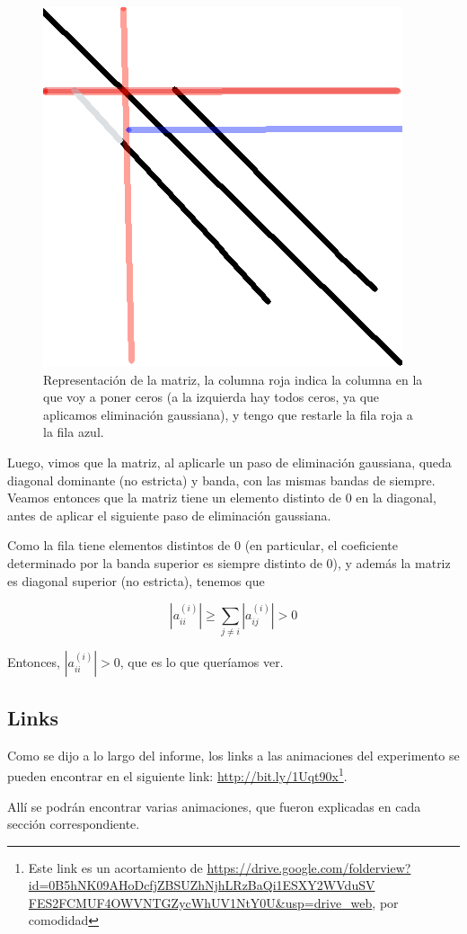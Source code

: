 \begin{figure}[H]
    \begin{center}
\includegraphics[scale=0.3]{imgs/expl.png}
\end{center}
\caption{\footnotesize{Representación de la matriz, la columna roja indica la columna en la que voy a poner ceros (a la izquierda hay todos ceros, ya que aplicamos eliminación gaussiana), y tengo que restarle la fila roja a la fila azul.}}
 \end{figure}

Luego, vimos que la matriz, al aplicarle un paso de eliminación gaussiana, queda diagonal dominante (no estricta) y banda, con las mismas bandas de siempre. Veamos entonces que la matriz tiene un elemento distinto de 0 en la diagonal, antes de aplicar el siguiente paso de eliminación gaussiana.

Como la fila tiene elementos distintos de 0 (en particular, el coeficiente determinado por la banda superior es siempre distinto de 0), y además la matriz es diagonal superior (no estricta), tenemos que

\[
  |a_{ii}^{(i)}| \geq \sum_{j \neq i} |a_{ij}^{(i)}| > 0
\]

Entonces, $|a_{ii}^{(i)}| > 0$, que es lo que queríamos ver.

\subsection{Links}
\label{sec:links}

Como se dijo a lo largo del informe, los links a las animaciones del experimento se pueden encontrar en el siguiente link: \url{http://bit.ly/1Uqt90x}\footnote{Este link es un acortamiento de \newline \url{https://drive.google.com/folderview?id=0B5hNK09AHoDcfjZBSUZhNjhLRzBaQi1ESXY2WVduSV FES2FCMUF4OWVNTGZycWhUV1NtY0U&usp=drive_web}, por comodidad}.

Allí se podrán encontrar varias animaciones, que fueron explicadas en cada sección correspondiente. 



